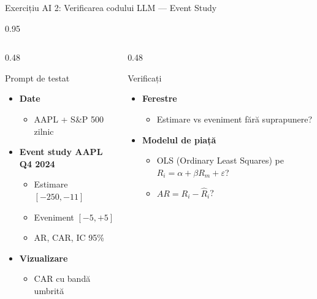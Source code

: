 \documentclass[9pt, aspectratio=169, t]{beamer}
\begin{document}
\begin{frame}[shrink=15]{Exercițiu AI 2: Verificarea codului LLM --- Event Study}
\begin{cminipage}{0.95\textwidth}
\begin{columns}[T]
\begin{column}{0.48\textwidth}
\begin{block}{\footnotesize Prompt de testat}
\footnotesize
\begin{itemize}\setlength{\itemsep}{0pt}
    \item \textbf{Date}
    \begin{itemize}\setlength{\itemsep}{0pt}
        \item AAPL + S\&P 500 zilnic
    \end{itemize}
    \item \textbf{Event study AAPL Q4 2024}
    \begin{itemize}\setlength{\itemsep}{0pt}
        \item Estimare $[-250, -11]$
        \item Eveniment $[-5, +5]$
        \item AR, CAR, IC 95\%
    \end{itemize}
    \item \textbf{Vizualizare}
    \begin{itemize}\setlength{\itemsep}{0pt}
        \item CAR cu bandă umbrită
    \end{itemize}
\end{itemize}
\end{block}
\end{column}
\begin{column}{0.48\textwidth}
\begin{block}{\footnotesize Verificați}
\footnotesize
\begin{itemize}\setlength{\itemsep}{0pt}
    \item \textbf{Ferestre}
    \begin{itemize}\setlength{\itemsep}{0pt}
        \item Estimare vs eveniment fără suprapunere?
    \end{itemize}
    \item \textbf{Modelul de piață}
    \begin{itemize}\setlength{\itemsep}{0pt}
        \item OLS (Ordinary Least Squares) pe $R_i = \alpha + \beta R_m + \varepsilon$?
        \item $AR = R_i - \hat{R}_i$?

\end{itemize}
\end{itemize}
\end{block}
\end{column}
\end{columns}
\end{cminipage}
\end{frame}
\end{document}
